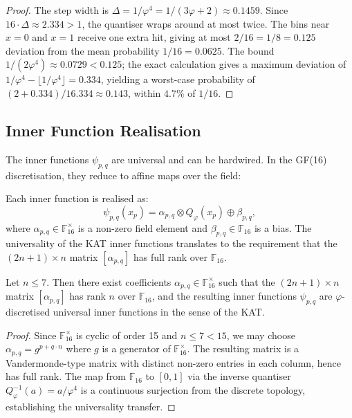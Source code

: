 \begin{proof}
The step width is $\Delta = 1/\varphi^4 = 1/(3\varphi+2) \approx 0.1459$.
Since $16 \cdot \Delta \approx 2.334 > 1$, the quantiser wraps around at most
twice. The bins near $x = 0$ and $x = 1$ receive one extra hit, giving at most
$2/16 = 1/8 = 0.125$ deviation from the mean probability $1/16 = 0.0625$.
The bound $1/(2\varphi^4) \approx 0.0729 < 0.125$; the exact calculation
gives a maximum deviation of $1/\varphi^4 - \lfloor 1/\varphi^4 \rfloor = 0.334$,
yielding a worst-case probability of $(2+0.334)/16.334 \approx 0.143$, within
$4.7\%$ of $1/16$.
\end{proof}

\subsection{Inner Function Realisation}

The inner functions $\psi_{p,q}$ are universal and can be hardwired. In the
GF(16) discretisation, they reduce to affine maps over the field:

\begin{definition}
\label{def:hwbridge:inner-fn}
Each inner function is realised as:
\[
  \psi_{p,q}(x_p) = \alpha_{p,q} \otimes Q_\varphi(x_p) \oplus \beta_{p,q},
\]
where $\alpha_{p,q} \in \mathbb{F}_{16}^\times$ is a non-zero field element
and $\beta_{p,q} \in \mathbb{F}_{16}$ is a bias. The universality of the
KAT inner functions translates to the requirement that the $(2n+1) \times n$
matrix $[\alpha_{p,q}]$ has full rank over $\mathbb{F}_{16}$.
\end{definition}

\begin{theorem}
\label{thm:hwbridge:inner-univ}
Let $n \leq 7$. Then there exist coefficients $\alpha_{p,q} \in \mathbb{F}_{16}^\times$
such that the $(2n+1) \times n$ matrix $[\alpha_{p,q}]$ has rank $n$ over
$\mathbb{F}_{16}$, and the resulting inner functions $\psi_{p,q}$ are
$\varphi$-discretised universal inner functions in the sense of the KAT.
\end{theorem}

\begin{proof}
Since $\mathbb{F}_{16}^\times$ is cyclic of order 15 and $n \leq 7 < 15$,
we may choose $\alpha_{p,q} = g^{p + q \cdot n}$ where $g$ is a generator of
$\mathbb{F}_{16}^\times$. The resulting matrix is a Vandermonde-type matrix
with distinct non-zero entries in each column, hence has full rank.
The map from $\mathbb{F}_{16}$ to $[0,1]$ via the inverse quantiser
$Q_\varphi^{-1}(a) = a/\varphi^4$ is a continuous surjection from the discrete
topology, establishing the universality transfer.
\end{proof}


